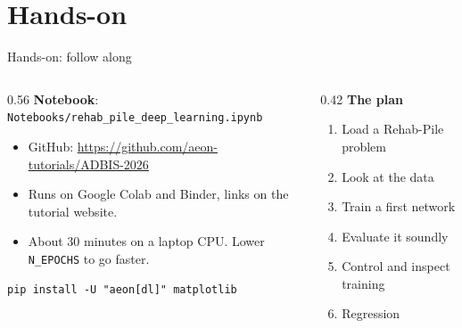 \documentclass[aspectratio=169,10pt]{beamer}
\begin{document}
\section{Hands-on}

\begin{frame}[fragile]{Hands-on: follow along}
  \begin{columns}[c]
    \begin{column}{0.56\textwidth}
      \textbf{Notebook}: \texttt{Notebooks/rehab\_pile\_deep\_learning.ipynb}
      \begin{itemize}
        \item GitHub: \url{https://github.com/aeon-tutorials/ADBIS-2026}
        \item Runs on Google Colab and Binder, links on the tutorial website.
        \item About 30 minutes on a laptop CPU. Lower \texttt{N\_EPOCHS} to go faster.
      \end{itemize}
\begin{lstlisting}
pip install -U "aeon[dl]" matplotlib
\end{lstlisting}
    \end{column}
    \begin{column}{0.42\textwidth}
      \textbf{The plan}
      \begin{enumerate}
        \item Load a Rehab-Pile problem
        \item Look at the data
        \item Train a first network
        \item Evaluate it soundly
        \item Control and inspect training
        \item Regression
      \end{enumerate}
    \end{column}
  \end{columns}
\end{frame}
\end{document}
